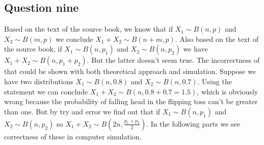 \documentclass[12pt, a4paper]{book}
\begin{document}
\clearpage

\subsection*{Question nine}

Based on the text of the source book, we know that if $X_1 \sim B(n, p)$ and $X_2 \sim B(m, p)$ we conclude
$X_1 + X_2 \sim B(n+m, p)$. Also based on the text of the source book, if $X_1 \sim B(n, p_1)$ and
$X_2 \sim B(n, p_2)$ we have $X_1+X_2 \sim B(n, p_1+p_2)$. But the latter doesn't seem true.
The incorrectness of that could be shown with both theoretical approach and simulation.
Suppose we have two distributions $X_1 \sim B(n, 0.8)$ and $X_2 \sim B(n, 0.7)$. Using the statement
we can conclude $X_1+X_2 \sim B(n, 0.8+0.7=1.5)$, which is obviously wrong because the probability
of falling head in the flipping toss can't be greater than one. But by try and error we
find out that if $X_1 \sim B(n, p_1)$ and $X_2 \sim B(n, p_2)$ so $X_1 + X_2 \sim B(2n, \frac{p_1+p_2}{2})$.
In the following parts we see correctness of these in computer simulation.
\end{document}
